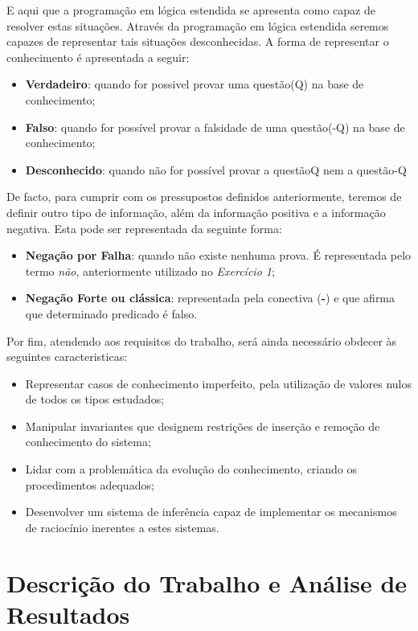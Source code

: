 E aqui que a programação em lógica estendida se apresenta como capaz de resolver estas situações. Através da programação em lógica estendida seremos capazes de representar tais situações desconhecidas. A forma de representar o conhecimento é apresentada a seguir:


\begin{itemize}
	\item \textbf{Verdadeiro}: quando for possivel provar uma questão(Q) na base de conhecimento; 
	\item \textbf{Falso}: quando for possível provar a falsidade de uma questão(-Q) na base de conhecimento;
	\item \textbf{Desconhecido}: quando não for possível provar a questãoQ nem a questão-Q
\end{itemize}


De facto, para cumprir com os pressupostos definidos anteriormente, teremos de definir outro tipo de informação, além da informação positiva e a informação negativa. Esta pode ser representada da seguinte forma:


\begin{itemize}
	\item \textbf{Negação por Falha}: quando não existe nenhuma prova. É representada pelo termo \textit{não}, anteriormente utilizado no \textit{Exercício 1};
	\item \textbf{Negação Forte ou clássica}: representada pela conectiva (\textbf{-}) e que afirma que determinado predicado é falso.
\end{itemize}

Por fim, atendendo aos requisitos do trabalho, será ainda necessário obdecer às seguintes caracteristicas:

\begin{itemize}
	\item Representar casos de conhecimento imperfeito, pela utilização de valores nulos de todos os tipos estudados;
	\item Manipular invariantes que designem restrições de inserção e remoção de conhecimento do sistema; 
	\item Lidar com a problemática da evolução do conhecimento, criando os procedimentos adequados;
	\item Desenvolver um sistema de inferência capaz de implementar os mecanismos de raciocínio inerentes a estes sistemas.

\end{itemize}

\chapter{Descrição do Trabalho e Análise de Resultados}
\label{cap:p3}

